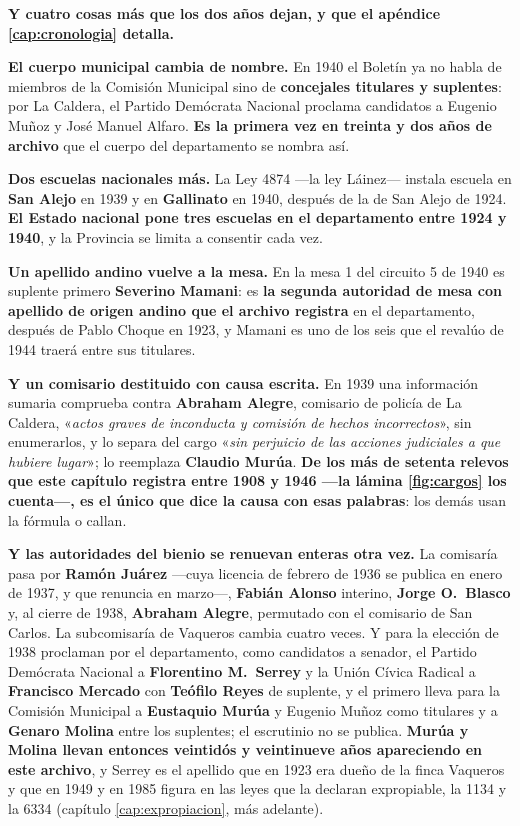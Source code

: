 \begin{cautela}
\begin{cautela}
\textbf{Y cuatro cosas más que los dos años dejan, y que el apéndice
\ref{cap:cronologia} detalla.}

\textbf{El cuerpo municipal cambia de nombre.} En 1940 el Boletín ya no habla
de miembros de la Comisión Municipal sino de \textbf{concejales titulares y
suplentes}: por La Caldera, el Partido Demócrata Nacional proclama candidatos a Eugenio Muñoz y José Manuel Alfaro. \textbf{Es la
primera vez en treinta y dos años de archivo} que el cuerpo del departamento se
nombra así.

\textbf{Dos escuelas nacionales más.} La Ley 4874 ---la ley Láinez--- instala
escuela en \textbf{San Alejo} en 1939 y en \textbf{Gallinato} en 1940, después
de la de San Alejo de 1924. \textbf{El Estado nacional pone tres escuelas en el
departamento entre 1924 y 1940}, y la Provincia se limita a consentir cada vez.

\textbf{Un apellido andino vuelve a la mesa.} En la mesa 1
del circuito 5 de 1940 es suplente primero \textbf{Severino Mamani}: es
\textbf{la segunda autoridad de mesa con apellido de origen andino que el archivo registra} en el
departamento, después de Pablo Choque en 1923, y Mamani es uno de los seis que el revalúo
de 1944 traerá entre sus titulares.

\textbf{Y un comisario destituido con causa escrita.} En 1939 una información
sumaria comprueba contra \textbf{Abraham Alegre}, comisario de policía de La
Caldera, «\textit{actos graves de inconducta y comisión de hechos incorrectos}», sin
enumerarlos, y lo separa del cargo «\textit{sin perjuicio de las acciones
judiciales a que hubiere lugar}»; lo reemplaza \textbf{Claudio Murúa}. \textbf{De
los más de setenta relevos que este capítulo registra entre 1908 y 1946 ---la
lámina \ref{fig:cargos} los cuenta---, es el único que dice la causa con esas palabras}: los demás usan la fórmula o callan.
\end{cautela}

\textbf{Y las autoridades del bienio se renuevan enteras otra vez.} La
comisaría pasa por \textbf{Ramón Juárez} ---cuya licencia de febrero de 1936 se publica en enero de 1937, y que
renuncia en marzo---, \textbf{Fabián Alonso} interino, \textbf{Jorge O.\ Blasco}
y, al cierre de 1938, \textbf{Abraham Alegre}, permutado con el comisario de
San Carlos. La subcomisaría de Vaqueros cambia cuatro veces. Y para la elección de
1938 proclaman por el departamento, como candidatos a senador, el Partido Demócrata Nacional a \textbf{Florentino M.\ Serrey}
 y la Unión Cívica Radical a \textbf{Francisco Mercado} con
\textbf{Teófilo Reyes} de suplente, y el primero lleva para la Comisión Municipal
a \textbf{Eustaquio Murúa} y Eugenio Muñoz como
titulares y a \textbf{Genaro Molina} entre los suplentes; el escrutinio no se publica. \textbf{Murúa y Molina
llevan entonces veintidós y veintinueve años apareciendo en este archivo}, y
Serrey es el apellido que en 1923 era dueño de la finca Vaqueros y que en 1949 y en 1985
figura en las leyes que la declaran expropiable, la 1134 y la 6334 (capítulo
\ref{cap:expropiacion}, más adelante).


\end{cautela}
